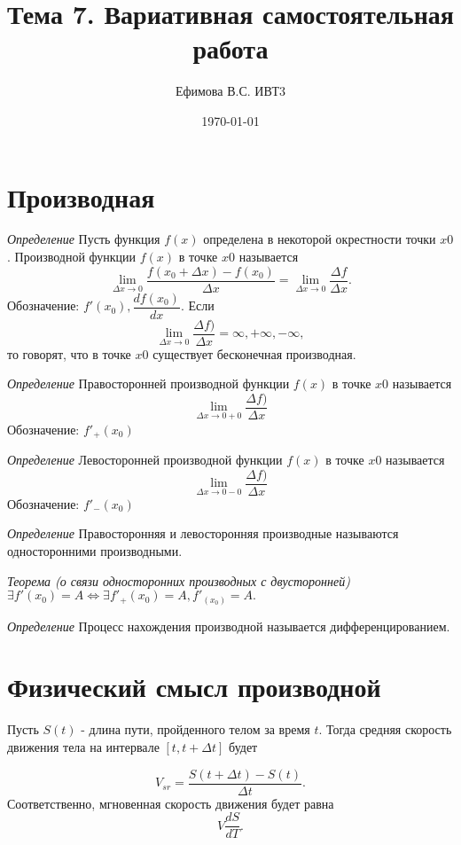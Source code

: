 \documentclass[a4paper,12pt]{article} %
\author{Ефимова В.С. ИВТ3}
\title{Тема 7. Вариативная самостоятельная работа}
\date{\today}
\begin{document}
\maketitle
\newpage
\section{Производная}
\textit{Определение}
Пусть функция $f(x)$ определена в некоторой окрестности точки
$x0$. Производной функции $f(x)$ в точке $x0$ называется
\begin{equation*}
\lim_{\Delta x \to 0}\frac{f(x_{0}+\Delta x)-f(x_{0})}{\Delta x}=\lim_{\Delta x \to 0}\frac{\Delta f}{\Delta x}.
\end{equation*}
Обозначение: $f'(x_{0}), \dfrac{df(x_{0})}{dx}.$
Если 
\begin{equation*}
\lim_{\Delta x \to 0}\frac{\Delta f)}{\Delta x}=\infty, +\infty, -\infty,
\end{equation*}
то говорят, что в точке $x0$ существует бесконечная производная.

\textit{Определение}
Правосторонней производной функции $f(x)$ в точке $x0$ называется
\begin{equation*}
\lim_{\Delta x \to 0+0}\frac{\Delta f)}{\Delta x}
\end{equation*}
Обозначение: $f'_{+}(x_{0})$

\textit{Определение}
Левосторонней производной функции $f(x)$ в точке $x0$ называется
\begin{equation*}
\lim_{\Delta x \to 0-0}\frac{\Delta f)}{\Delta x}
\end{equation*}
Обозначение: $f'_{-}(x_{0})$

\textit{Определение}
Правосторонняя и левосторонняя производные называются односторонними производными.

\textit{Теорема (о связи односторонних производных с двусторонней)}
$\exists f'(x_{0})=A\Leftrightarrow\exists f'_{+}(x_{0})=A, f'_(x_{0})=A.$

\textit{Определение}
Процесс нахождения производной называется дифференцированием.

\section{Физический смысл производной}
Пусть $S(t)$ - длина пути, пройденного телом за время $t$. Тогда
средняя скорость движения тела на интервале $[t, t + \Delta t]$ будет

\begin{equation*}
V_{sr}=\dfrac{S(t+\Delta t)- S(t)}{\Delta t}.
\end{equation*}
Соответственно, мгновенная скорость движения будет равна
\begin{equation*}
V\dfrac{dS}{dT}.
\end{equation*}
\end{document}
